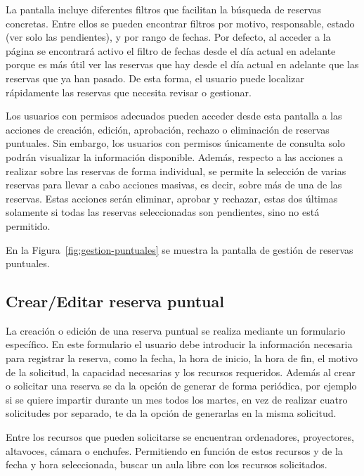 La pantalla incluye diferentes filtros que facilitan la búsqueda de reservas concretas. Entre ellos se pueden encontrar filtros por motivo, responsable, estado (ver solo las pendientes), y por rango de fechas. Por defecto, al acceder a la página se encontrará activo el filtro de fechas desde el día actual en adelante porque es más útil ver las reservas que hay desde el día actual en adelante que las reservas que ya han pasado. De esta forma, el usuario puede localizar rápidamente las reservas que necesita revisar o gestionar.

Los usuarios con permisos adecuados pueden acceder desde esta pantalla a las acciones de creación, edición, aprobación, rechazo o eliminación de reservas puntuales. Sin embargo, los usuarios con permisos únicamente de consulta solo podrán visualizar la información disponible.
Además, respecto a las acciones a realizar sobre las reservas de forma individual, se permite la selección de varias reservas para llevar a cabo acciones masivas, es decir, sobre más de una de las reservas. Estas acciones serán eliminar, aprobar y rechazar, estas dos últimas solamente si todas las reservas seleccionadas son pendientes, sino no está permitido.

En la Figura~\ref{fig:gestion-puntuales} se muestra la pantalla de gestión de reservas puntuales.


\subsection{Crear/Editar reserva puntual}

La creación o edición de una reserva puntual se realiza mediante un formulario específico. En este formulario el usuario debe introducir la información necesaria para registrar la reserva, como la fecha, la hora de inicio, la hora de fin, el motivo de la solicitud, la capacidad necesarias y los recursos requeridos. Además al crear o solicitar una reserva se da la opción de generar de forma periódica, por ejemplo si se quiere impartir durante un mes todos los martes, en vez de realizar cuatro solicitudes por separado, te da la opción de generarlas en la misma solicitud.

Entre los recursos que pueden solicitarse se encuentran ordenadores, proyectores, altavoces, cámara o enchufes. Permitiendo en función de estos recursos y de la fecha y hora seleccionada, buscar un aula libre con los recursos solicitados.

